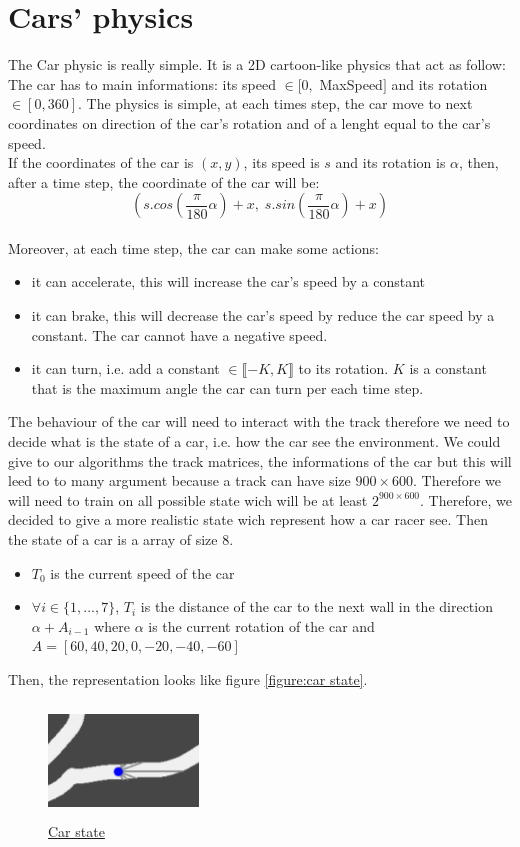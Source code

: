 \documentclass[11pt,a4paper]{article}
\newcounter{fig}
\newcommand{\mlist}[1]{\begin{itemize}[noitemsep,topsep=0pt]#1\end{itemize}}
\begin{document}
	
		\section{Cars' physics}
The Car physic is really simple. It is a 2D cartoon-like physics that act as follow:\\
The car has to main informations: its speed $\in [0,$ MaxSpeed$]$ and its rotation $\in [0,360]$. The physics is simple, at each times step, the car move to next coordinates on direction of the car's rotation and of a lenght equal to the car's speed.\\
If the coordinates of the car is $(x,y)$, its speed is $s$ and its rotation is $\alpha$, then, after a time step, the coordinate of the car will be:
\[(s.cos(\frac{\pi}{180}\alpha) + x,\; s.sin(\frac{\pi}{180}\alpha) + x)\]
\\
Moreover, at each time step, the car can make some actions:
\mlist{
\item it can accelerate, this will increase the car's speed by a constant
\item it can brake, this will decrease the car's speed by reduce the car speed by a constant. The car cannot have a negative speed.
\item it can turn, i.e. add a constant $\in \llbracket-K,K\rrbracket$ to its rotation. $K$ is a constant that is the maximum angle the car can turn per each time step.
}
The behaviour of the car will need to interact with the track therefore we need to decide what is the state of a car, i.e. how the car see the environment. We could give to our algorithms the track matrices, the informations of the car but this will leed to to many argument because a track can have size $900\times600$. Therefore we will need to train on all possible state wich will be at least $2^{900\times 600}$. Therefore, we decided to give a more realistic state wich represent how a car racer see. Then the state of a car is a array of size $8$.
\mlist{
\item $T_0$ is the current speed of the car
\item $\forall i\in\{1,...,7\}$, $T_i$ is the distance of the car to the next wall in the direction $\alpha + A_{i-1}$ where $\alpha$ is the current rotation of the car and $A=[60, 40, 20, 0, -20, -40, -60]$
}
Then, the representation looks like figure \ref{figure:car state}.
\begin{center}
\label{figure:car state}
	\begin{figure}[ht]
		\centering
		\includegraphics[width=4cm, height=3cm]{car_state.png}
		\caption{\underline{Car state}}
	\end{figure}
\end{center}
		
\end{document}
